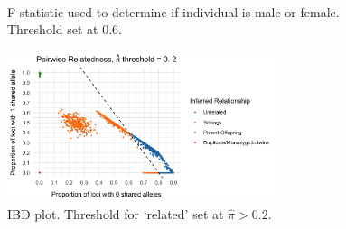 \documentclass[12pt]{article}
\begin{document}
\begin{figure}
\centering
{}
\\
\caption{F-statistic used to determine if individual is male or female. Threshold set at 0.6.}
\label{fig:impute_sex}
\end{figure}

\begin{figure}
\centering
\includegraphics[width=0.7\textwidth]{06_IBD_plot.jpg}
\caption{IBD plot. Threshold for `related' set at $\hat{\pi} > 0.2$.}
\label{fig:IBD_plot}
\end{figure}
\end{document}
